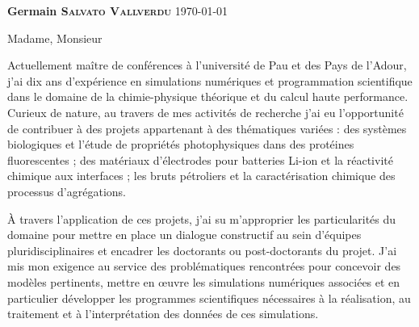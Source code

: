 \documentclass[11pt,a4paper,ragged2e]{../alta_letter}
\begin{document}
\name{}
\tagline{}


{\color{emphasis}\Large\bfseries Germain \textsc{Salvato Vallverdu}}
\hfill\today\par

\parbox{.5\textwidth}{\makecvheader}

\justify

\vspace{-5mm}
\cvsection{~}

\setlength{\parindent}{0pt}
\setlength{\parskip}{1.5ex plus 0.5ex minus 0.5ex}

\bigskip

Madame, Monsieur

\medskip
\onehalfspacing


Actuellement maître de conférences à l'université de Pau et des Pays de l'Adour, j'ai dix
ans d'expérience en simulations numériques et programmation scientifique dans le domaine
de la chimie-physique théorique et du calcul haute performance. Curieux de nature, au travers de mes activités de
recherche j'ai eu l'opportunité de contribuer à des projets appartenant à des thématiques
variées : des systèmes biologiques et l'étude de propriétés photophysiques dans des
protéines fluorescentes ; des matériaux d'électrodes pour batteries Li-ion et la
réactivité chimique aux interfaces ; les bruts pétroliers et la caractérisation chimique
des processus d'agrégations.

À travers l'application de ces projets, j'ai su m'approprier les particularités du domaine
pour mettre en place un dialogue constructif au sein d'équipes pluridisciplinaires et
encadrer les doctorants ou post-doctorants du projet. J'ai mis mon exigence au service des
problématiques rencontrées pour concevoir des modèles pertinents, mettre en œuvre les
simulations numériques associées et en particulier développer les programmes scientifiques
nécessaires à la réalisation, au traitement et à l'interprétation des données de ces
simulations.
\end{document}
